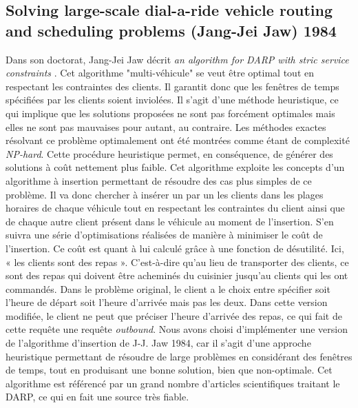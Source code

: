\documentclass[10pt,a4paper]{report}
\begin{document}
\subsection*{Solving large-scale dial-a-ride vehicle routing and scheduling problems (Jang-Jei Jaw) 1984 }
Dans son doctorat, Jang-Jei Jaw décrit \textit{\og an algorithm for DARP with stric service constraints \fg{}}.  Cet algorithme "multi-véhicule" se veut être optimal tout en respectant les contraintes des clients.
Il garantit donc que les fenêtres de temps spécifiées par les clients soient inviolées.
Il s'agit d'une méthode heuristique, ce qui implique que les solutions proposées ne sont pas forcément optimales mais elles ne sont pas mauvaises pour autant, au contraire. Les méthodes exactes résolvant ce problème optimalement ont été montrées comme étant de complexité \textit{NP-hard}. %
Cette procédure heuristique permet, en conséquence, de générer des solutions à coût nettement plus faible.%
Cet algorithme exploite les concepts d'un algorithme à insertion permettant de résoudre des cas plus simples de ce problème. Il va donc chercher à insérer un par un les clients dans les plages horaires de chaque véhicule tout en respectant les contraintes du client ainsi que de chaque autre client présent dans le véhicule au moment de l'insertion.
S'en suivra une série d'optimisations réalisées de manière à minimiser le coût de l'insertion. Ce coût est quant à lui calculé grâce à une fonction de désutilité. Ici, « les clients sont des repas ». C'est-à-dire qu'au lieu de transporter des clients, ce sont des repas qui doivent être acheminés du cuisinier jusqu'au clients qui les ont commandés.
Dans le problème original, le client a le choix entre spécifier soit l'heure de départ soit l'heure d'arrivée mais pas les deux. Dans cette version modifiée, le client ne peut que préciser l'heure d'arrivée des repas, ce qui fait de cette requête une requête \textit{outbound}. 
\newline
Nous avons choisi d'implémenter une version de l'algorithme d'insertion de J-J. Jaw 1984, car il s'agit d'une approche heuristique permettant de résoudre de large problèmes en considérant des fenêtres de temps, tout en produisant une bonne solution, bien que non-optimale. Cet algorithme est référencé par un grand nombre d'articles scientifiques traitant le DARP, ce qui en fait une source très fiable.
\end{document}
